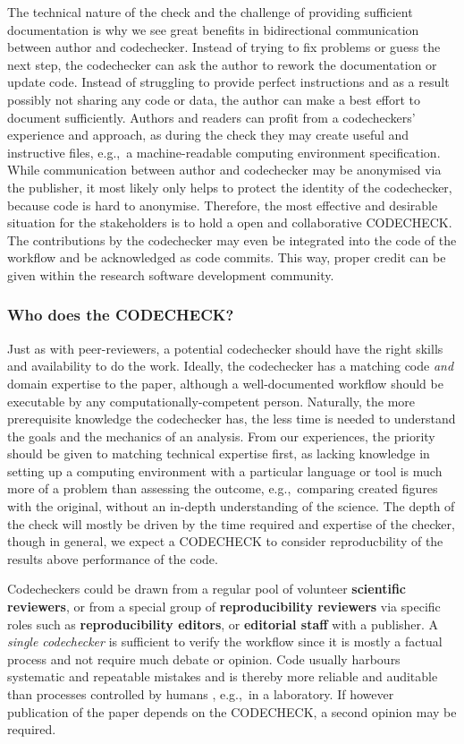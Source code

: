 \documentclass[12pt]{article}
\begin{document}
The technical nature of the check and the challenge of providing sufficient documentation is why we see great benefits in bidirectional communication between author and codechecker.
Instead of trying to
fix problems or guess the next step, the codechecker can ask the author to 
rework the documentation or update code.
Instead of struggling to provide perfect instructions and as a result possibly not sharing any code or data, the author can make a best effort to document sufficiently.
Authors and readers can profit from a codecheckers' experience and approach, as during the check they may create useful and instructive files, e.g.,~a machine-readable computing environment specification.
While communication between author and codechecker may be anonymised via
the publisher, it most likely only helps to protect the identity of
the codechecker, because code is hard to anonymise.
Therefore, the most effective and desirable situation for the
stakeholders is to hold a open and collaborative CODECHECK.
The contributions by the codechecker may even be integrated into
the code of the workflow and be acknowledged as code commits. This way, 
proper credit can be given within the research software development community.


\subsubsection*{Who does the CODECHECK?}\label{who-does-the-codecheck}

Just as with peer-reviewers, a potential codechecker should have the
right skills and availability to do the work.  Ideally, the
codechecker has a matching code \emph{and} domain expertise to the
paper, although a well-documented workflow should be executable by any
computationally-competent person. Naturally, the more
prerequisite knowledge the codechecker has, the less time is needed to
understand the goals and the mechanics of an analysis.  From our
experiences, the priority should be given to matching technical
expertise first, as lacking knowledge in setting up a computing
environment with a particular language or tool is much more of a
problem than assessing the outcome, e.g.,~comparing created figures
with the original, without an in-depth understanding of the science.
The depth of the check will mostly be driven by the time required and
expertise of the checker, though in general, we expect a CODECHECK 
to consider reproducbility of the results above performance of the code.


Codecheckers could be drawn from a regular pool of volunteer
\textbf{scientific reviewers}, or from a special group of
\textbf{reproducibility reviewers} via specific roles such as
\textbf{reproducibility editors}, or \textbf{editorial staff} with a
publisher.  A \emph{single codechecker} is sufficient to verify the
workflow since it is mostly a factual process and not require much
debate or opinion.  Code usually harbours systematic and repeatable
mistakes and is thereby more reliable and auditable than processes
controlled by humans \cite{tibav:42484}, e.g.,~in a laboratory.  If
however publication of the paper depends on the CODECHECK, a second
opinion may be required.
\end{document}

